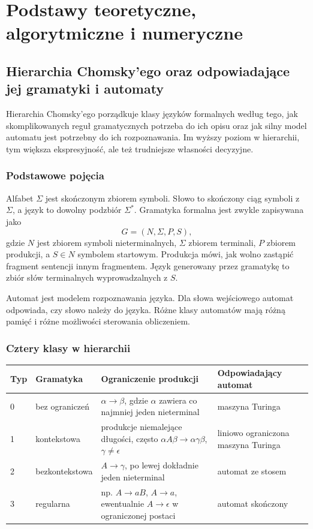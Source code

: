 \section{Podstawy teoretyczne, algorytmiczne i numeryczne}

\subsection{Hierarchia Chomsky'ego oraz odpowiadające jej gramatyki i automaty}

Hierarchia Chomsky'ego porządkuje klasy języków formalnych według tego, jak skomplikowanych reguł gramatycznych potrzeba do ich opisu oraz jak silny model automatu jest potrzebny do ich rozpoznawania. Im wyższy poziom w hierarchii, tym większa ekspresyjność, ale też trudniejsze własności decyzyjne.

\subsubsection{Podstawowe pojęcia}

Alfabet $\Sigma$ jest skończonym zbiorem symboli. Słowo to skończony ciąg symboli z $\Sigma$, a język to dowolny podzbiór $\Sigma^*$. Gramatyka formalna jest zwykle zapisywana jako
\[
G=(N,\Sigma,P,S),
\]
gdzie $N$ jest zbiorem symboli nieterminalnych, $\Sigma$ zbiorem terminali, $P$ zbiorem produkcji, a $S\in N$ symbolem startowym. Produkcja mówi, jak wolno zastąpić fragment sentencji innym fragmentem. Język generowany przez gramatykę to zbiór słów terminalnych wyprowadzalnych z $S$.

Automat jest modelem rozpoznawania języka. Dla słowa wejściowego automat odpowiada, czy słowo należy do języka. Różne klasy automatów mają różną pamięć i różne możliwości sterowania obliczeniem.

\subsubsection{Cztery klasy w hierarchii}

\begin{longtable}{p{}p{}p{}p{}}
\toprule
Typ & Gramatyka & Ograniczenie produkcji & Odpowiadający automat \\
\midrule
0 & bez ograniczeń & $\alpha\to\beta$, gdzie $\alpha$ zawiera co najmniej jeden nieterminal & maszyna Turinga \\
1 & kontekstowa & produkcje niemalejące długości, często $\alpha A\beta\to\alpha\gamma\beta$, $\gamma\ne\epsilon$ & liniowo ograniczona maszyna Turinga \\
2 & bezkontekstowa & $A\to\gamma$, po lewej dokładnie jeden nieterminal & automat ze stosem \\
3 & regularna & np. $A\to aB$, $A\to a$, ewentualnie $A\to\epsilon$ w ograniczonej postaci & automat skończony \\
\bottomrule
\end{longtable}

